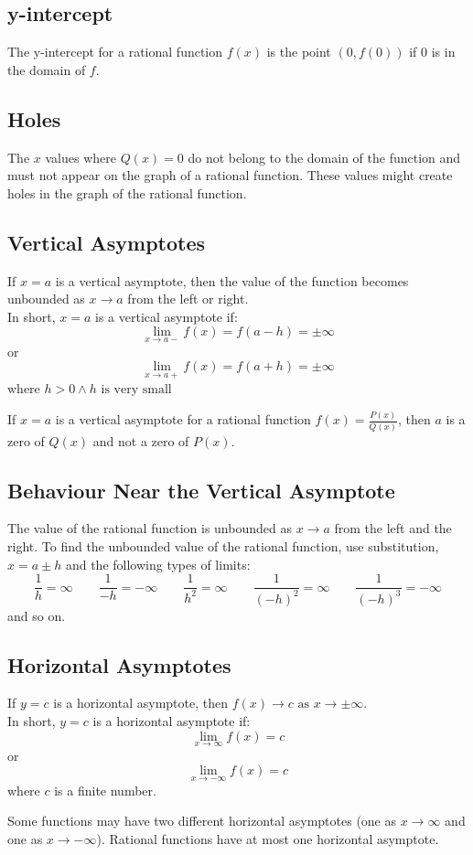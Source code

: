 		\subsection{y-intercept}
			The y-intercept for a rational function $f(x)$ is the point $(0, f(0))$ if 0 is in the domain of $f$.
		\subsection{Holes}
			The $x$ values where $Q(x) = 0$ do not belong to the domain of the function and must not appear on the graph of a rational function. These values might create holes in the graph of the rational function.
		\newpage
		\subsection{Vertical Asymptotes}
			If $x=a$ is a vertical asymptote, then the value of the function becomes unbounded as $x \to a$ from the left or right.
			\\
			In short, $x=a$ is a vertical asymptote if:
			\[\lim_{x \to a-} f(x) = f(a - h) = \pm\infty\]
			or
			\[\lim_{x \to a+} f(x) = f(a + h) = \pm\infty\]
			where $h > 0 \wedge h \text{ is very small}$

			If $x=a$ is a vertical asymptote for a rational function $f(x) = \frac{P(x)}{Q(x)}$, then $a$ is a zero of $Q(x)$ and not a zero of $P(x)$.
		\subsection{Behaviour Near the Vertical Asymptote}
			The value of the rational function is unbounded as $x \to a$ from the left and the right. To find the unbounded value of the rational function, use substitution, $x = a \pm h$ and the following types of limits:
			\[\frac{1}{h}=\infty \qquad \frac{1}{-h}=-\infty \qquad \frac{1}{h^2}=\infty \qquad \frac{1}{(-h)^2}=\infty \qquad \frac{1}{(-h)^3}=-\infty\]
			and so on.
		\subsection{Horizontal Asymptotes}
			If $y=c$ is a horizontal asymptote, then $f(x) \to c \text{ as } x \to \pm\infty$.
			\\
			In short, $y=c$ is a horizontal asymptote if:
			\[\lim_{x \to \infty} f(x) = c\]
			or
			\[\lim_{x \to -\infty} f(x) = c\]
			where $c$ is a finite number.

			Some functions may have two different horizontal asymptotes (one as $x \to \infty$ and one as $x \to -\infty$). Rational functions have at most one horizontal asymptote.

